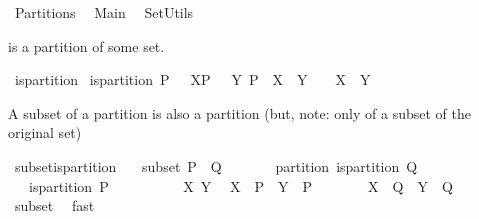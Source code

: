 %
\begin{isabellebody}%
\def\isabellecontext{Partitions}%
%
\isamarkuptrue%
%
\isadelimtheory
%
\endisadelimtheory
%
\isatagtheory
{}\isamarkupfalse%
\ Partitions\isanewline
{}\isanewline
\ \ Main\isanewline
\ \ SetUtils\isanewline
\isanewline
{}%
\endisatagtheory
{\isafoldtheory}%
%
\isadelimtheory
%
\endisadelimtheory
%
\begin{isamarkuptext}%
 is a partition of some set.%
\end{isamarkuptext}%
\isamarkuptrue%
\isamarkupfalse%
\ is{\isacharunderscore}partition\ \isanewline
{\isachardoublequoteopen}is{\isacharunderscore}partition\ P\ {\isacharequal}\ {\isacharparenleft}{\isasymforall}\ X{\isasymin}P\ {\isachardot}\ {\isasymforall}\ Y{\isasymin}\ P\ {\isachardot}\ {\isacharparenleft}X\ {\isasyminter}\ Y\ {\isasymnoteq}\ {\isacharbraceleft}{\isacharbraceright}\ {\isasymlongleftrightarrow}\ X\ {\isacharequal}\ Y{\isacharparenright}{\isacharparenright}{\isachardoublequoteclose}%
\begin{isamarkuptext}%
A subset of a partition is also a partition (but, note: only of a subset of the original set)%
\end{isamarkuptext}%
\isamarkuptrue%
\isamarkupfalse%
\ subset{\isacharunderscore}is{\isacharunderscore}partition{\isacharcolon}\isanewline
\ \ \ subset{\isacharcolon}\ {\isachardoublequoteopen}P\ {\isasymsubseteq}\ Q{\isachardoublequoteclose}\isanewline
\ \ \ \ \ \ \ partition{\isacharcolon}\ {\isachardoublequoteopen}is{\isacharunderscore}partition\ Q{\isachardoublequoteclose}\isanewline
\ \ \ {\isachardoublequoteopen}is{\isacharunderscore}partition\ P{\isachardoublequoteclose}\isanewline
%
\isadelimproof
\isanewline
%
\endisadelimproof
%
\isatagproof
{}\isamarkupfalse%
\ {\isacharminus}\isanewline
\ \ \isacommand{{\isacharbraceleft}}\isamarkupfalse%
\isanewline
\ \ \ \ \isamarkupfalse%
\ X\ Y\ \isamarkupfalse%
\ {\isachardoublequoteopen}X\ {\isasymin}\ P\ {\isasymand}\ Y\ {\isasymin}\ P{\isachardoublequoteclose}\isanewline
\ \ \ \ \isamarkupfalse%
\ \isamarkupfalse%
\ {\isachardoublequoteopen}X\ {\isasymin}\ Q\ {\isasymand}\ Y\ {\isasymin}\ Q{\isachardoublequoteclose}\ \isamarkupfalse%
\ subset\ \isamarkupfalse%
\ fast\isanewline
\ \ \ \ \isamarkupfalse%

\end{isabellebody}
